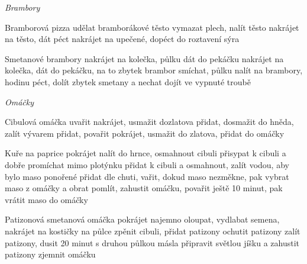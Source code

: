 \documentclass[12pt,a4paper]{article}
\begin{document}
\vspace*{\fill}
\hfill {\Huge\it Brambory}\hfill
\vspace*{\fill}
\newpage

\begin{recipe}{Bramborová pizza}
   udělat bramborákové těsto
   vymazat plech, nalít těsto
   nakrájet na těsto, dát péct
   nakrájet na upečené, dopéct do roztavení sýra
\end{recipe}
\newpage

\begin{recipe}{Smetanové brambory}
   nakrájet na kolečka, půlku dát do pekáčku
   nakrájet na kolečka, dát do pekáčku, na to zbytek brambor
   smíchat, půlku nalít na brambory, hodinu péct, dolít zbytek smetany a nechat dojít ve vypnuté troubě
\end{recipe}
\newpage

\vspace*{\fill}
\hfill {\Huge\it Omáčky}\hfill
\vspace*{\fill}
\newpage

\begin{recipe}{Cibulová omáčka}
   uvařit
  nakrájet, usmažit dozlatova
  přidat, dosmažit do hněda, zalít vývarem
   přidat, povařit
  pokrájet, usmažit do zlatova, přidat do omáčky
\end{recipe}
\newpage

\begin{recipe}{Kuře na paprice}
   pokrájet
   nalít do hrnce, osmahnout cibuli
   přisypat k cibuli a dobře promíchat mimo plotýnku
   přidat k cibuli a osmahnout, zalít vodou, aby bylo maso ponořené
   přidat dle chuti, vařit, dokud maso nezměkne, pak vybrat maso z omáčky a obrat
   pomlít, zahustit omáčku, povařit ještě 10 minut, pak vrátit maso do omáčky
\end{recipe}
\newpage

\begin{recipe}{Patizonová smetanová omáčka}
   pokrájet najemno
   oloupat, vydlabat semena, nakrájet na kostičky
   na půlce zpěnit cibuli, přidat patizony
   ochutit patizony
   zalít patizony, dusit 20 minut
   s druhou půlkou másla připravit světlou jíšku a zahustit patizony
   zjemnit omáčku
\end{recipe}
\newpage
\end{document}
